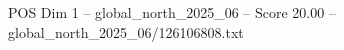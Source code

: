 \begin{textsample}{POS Dim 1 – global\_north\_2025\_06 – Score 20.00 – global\_north\_2025\_06/126106808.txt}
\end{textsample}
